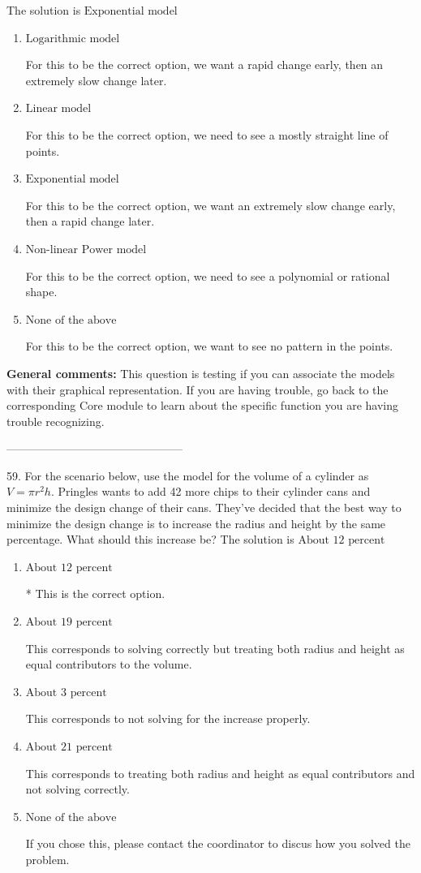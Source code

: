 \documentclass{extbook}[14pt]
\begin{document}
The solution is $ \text{Exponential model} $ 

\begin{enumerate}[label=\Alph*.] 
\item $ \text{Logarithmic model} $ 

 For this to be the correct option, we want a rapid change early, then an extremely slow change later. 
\item $ \text{Linear model} $ 

 For this to be the correct option, we need to see a mostly straight line of points. 
\item $ \text{Exponential model} $ 

 For this to be the correct option, we want an extremely slow change early, then a rapid change later. 
\item $ \text{Non-linear Power model} $ 

 For this to be the correct option, we need to see a polynomial or rational shape. 
\item $ \text{None of the above} $ 

 For this to be the correct option, we want to see no pattern in the points. 
\end{enumerate} 
 
\textbf{General comments:} This question is testing if you can associate the models with their graphical representation. If you are having trouble, go back to the corresponding Core module to learn about the specific function you are having trouble recognizing.

-----------------------------------------------

59. For the scenario below, use the model for the volume of a cylinder as $V = \pi r^2 h$.
Pringles wants to add 42  more chips to their cylinder cans and minimize the design change of their cans. They've decided that the best way to minimize the design change is to increase the radius and height by the same percentage. What should this increase be? 
The solution is $ \text{About } 12 \text{ percent} $ 

\begin{enumerate}[label=\Alph*.] 
\item $ \text{About } 12 \text{ percent} $ 

 * This is the correct option. 
\item $ \text{About } 19 \text{ percent} $ 

 This corresponds to solving correctly but treating both radius and height as equal contributors to the volume. 
\item $ \text{About } 3 \text{ percent} $ 

 This corresponds to not solving for the increase properly. 
\item $ \text{About } 21 \text{ percent} $ 

 This corresponds to treating both radius and height as equal contributors and not solving correctly. 
\item $ \text{None of the above} $ 

 If you chose this, please contact the coordinator to discus how you solved the problem. 
\end{enumerate} 
 
\end{document}
